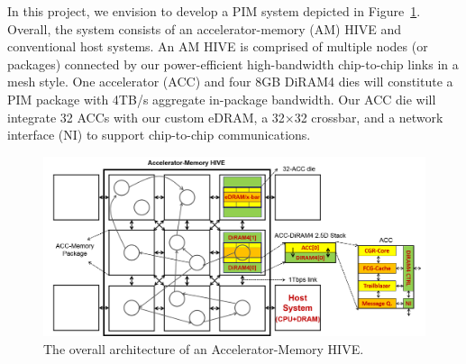 \noindent 
In this project, we envision to develop a PIM system depicted in Figure~\ref{fig:arch}. 
Overall, the system consists of an accelerator-memory (AM) HIVE and conventional host systems. 
An AM HIVE is comprised of multiple nodes (or packages) connected by our power-efficient high-bandwidth chip-to-chip links in a mesh style. 
One accelerator (ACC) and four 8GB DiRAM4 dies will constitute a PIM package with 4TB/s aggregate in-package bandwidth. 
Our ACC die will integrate 32 ACCs with our custom eDRAM, a 32×32 crossbar, and a network interface (NI) to support chip-to-chip communications.

\begin{figure}
\center
\includegraphics[width=1.0\linewidth]{./fig/arch.png}
\caption{The overall architecture of an Accelerator-Memory HIVE.}
\label{fig:arch}
\end{figure}
